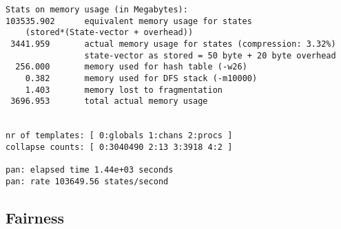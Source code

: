 \documentclass{llncs}
\begin{document}
\begin{lstlisting}[frame=single]
Stats on memory usage (in Megabytes):
103535.902      equivalent memory usage for states 
    (stored*(State-vector + overhead))
 3441.959       actual memory usage for states (compression: 3.32%)
                state-vector as stored = 50 byte + 20 byte overhead
  256.000       memory used for hash table (-w26)
    0.382       memory used for DFS stack (-m10000)
    1.403       memory lost to fragmentation
 3696.953       total actual memory usage


nr of templates: [ 0:globals 1:chans 2:procs ]
collapse counts: [ 0:3040490 2:13 3:3918 4:2 ]

pan: elapsed time 1.44e+03 seconds
pan: rate 103649.56 states/second
\end{lstlisting}

\subsection{Fairness}
\label{mc:app:unb:fair}
\end{document}
